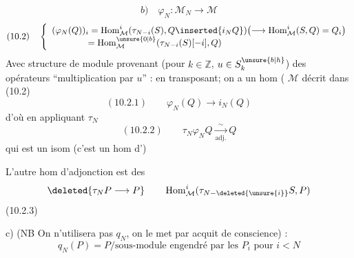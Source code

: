 \[
b)\quad\varphi_N:\mathcal M_N\longrightarrow\mathcal M
\]
\[
(10.2)\quad\left\{\begin{array}{l}
(\varphi_N(Q))_i=\operatorname{Hom}^i_{\mathcal M}(\tau_{N-i}(S),Q\inserted{i_NQ})
\bigl(\longrightarrow\operatorname{Hom}^i_{\mathcal M}(S,Q)=Q_i\bigr)\\
\hspace{4em}=\operatorname{Hom}^{\unsure{0|b}}_{\mathcal M}(\tau_{N-i}(S)[-i],Q)
\end{array}\right.
\]
Avec  structure de module provenant (pour $k\in\mathbb Z$, $u\in S_k^{\unsure{b|h}}$) des opérateurs ``multiplication par $u$'' :
en transposant; on a un hom (  $\mathcal M$ décrit dans (10.2)
\[
(10.2.1)\qquad\varphi_N(Q)\longrightarrow i_N(Q)
\]
d'où en appliquant $\tau_N$
\[
(10.2.2)\qquad\tau_N\varphi_NQ\underset{\text{adj.}}{\overset{\sim}{\longrightarrow}}Q
\]
qui est un isom (c'est un hom d')

L'autre hom d'adjonction
est  des  
\[
\deleted{\tau_NP\longrightarrow P}\qquad\operatorname{Hom}^i_{\mathcal M}(\tau_{N-\deleted{\unsure{i}}}S,P)
\]
(10.2.3)

c) (NB On n'utilisera pas $q_N$, on le met par acquit de conscience) :
\[
q_N(P)=P/\text{sous-module engendré par les }P_i\text{ pour }i<N
\]
